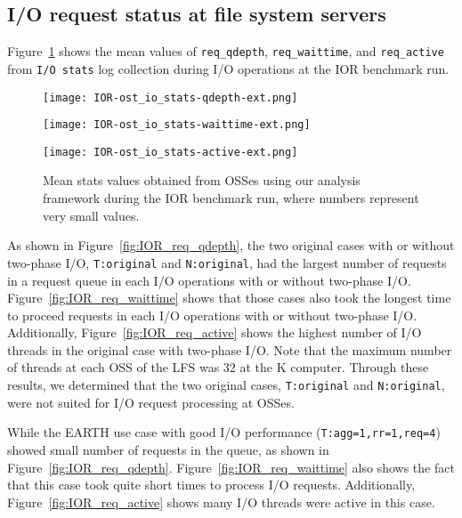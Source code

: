\documentclass{jhps}
\begin{document}
\subsection{I/O request status at file system servers}

Figure~\ref{fig:IOR_OST_IO_STATS} shows the mean values of
{\tt req\_qdepth}, {\tt req\_waittime}, and {\tt req\_active}
from {\tt I/O stats} log collection during I/O operations
at the IOR benchmark run.
%
\begin{figure}[tb]
\centering
\begin{minipage}[t]{0.46\textwidth}
 \centering
 \texttt{[image: IOR-ost\_io\_stats-qdepth-ext.png]}
 \label{fig:IOR_req_qdepth}
\end{minipage}
%
\begin{minipage}[t]{0.46\textwidth}
 \centering
 \texttt{[image: IOR-ost\_io\_stats-waittime-ext.png]}
 \label{fig:IOR_req_waittime}
\end{minipage}
%
\noindent
\begin{minipage}[t]{0.44\textwidth}
 \centering
 \texttt{[image: IOR-ost\_io\_stats-active-ext.png]}
 \label{fig:IOR_req_active}
\end{minipage}
%
\caption{Mean stats values obtained from OSSes using our analysis framework
during the IOR benchmark run, where numbers represent very small values.}
\label{fig:IOR_OST_IO_STATS}
\end{figure}
%
As shown in Figure~\ref{fig:IOR_req_qdepth}, the two original cases
with or without two-phase I/O, {\tt T:original} and {\tt N:original},
had the largest number of requests in a request queue
in each I/O operations with or without two-phase I/O.
Figure~\ref{fig:IOR_req_waittime} shows that those cases also took
the longest time to proceed requests
in each I/O operations with or without two-phase I/O.
Additionally, Figure~\ref{fig:IOR_req_active} shows
the highest number of I/O threads in the original case
with two-phase I/O.
Note that the maximum number of threads at each OSS of the LFS was 32
at the K computer.
Through these results, we determined that the two original cases,
{\tt T:original} and {\tt N:original}, were not suited for
I/O request processing at OSSes.

While the EARTH use case with good I/O performance ({\tt T:agg=1,rr=1,req=4})
showed small number of requests in the queue,
as shown in Figure~\ref{fig:IOR_req_qdepth}.
Figure~\ref{fig:IOR_req_waittime} also shows
the fact that this case took quite short times to process I/O requests.
Additionally, Figure~\ref{fig:IOR_req_active} shows
many I/O threads were active in this case.
\end{document}
